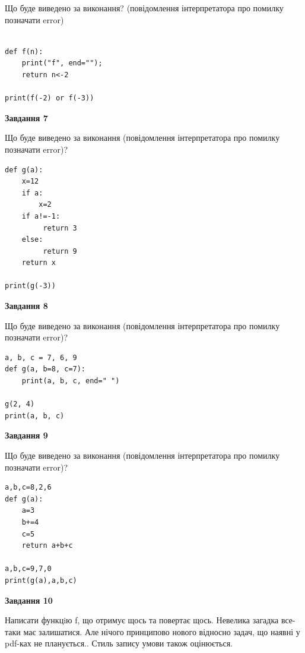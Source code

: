 \documentclass[12pt, ukrainian]{article}
\begin{document}
{\begin {large}
Що буде виведено за виконання? (повідомлення інтерпретатора про помилку позначати error)\par
\begin{verbatim}

def f(n):
    print("f", end="");
    return n<-2

print(f(-2) or f(-3))
\end{verbatim}

{\begin {center}\textbf{Завдання 7}\end {center}}

Що буде виведено за виконання (повідомлення інтерпретатора про помилку позначати error)?\par
\begin{verbatim}
def g(a):
    x=12
    if a: 
        x=2
    if a!=-1:
         return 3
    else:
         return 9
    return x

print(g(-3))
\end{verbatim}

{\begin {center}\textbf{Завдання 8}\end {center}}

Що буде виведено за виконання (повідомлення інтерпретатора про помилку позначати error)?\par
\begin{verbatim}
a, b, c = 7, 6, 9
def g(a, b=8, c=7):
    print(a, b, c, end=" ")

g(2, 4)
print(a, b, c)
\end{verbatim}

{\begin {center}\textbf{Завдання 9}\end {center}}

Що буде виведено за виконання (повідомлення інтерпретатора про помилку позначати error)?\par
\begin{verbatim}
a,b,c=8,2,6
def g(a):
    a=3
    b+=4
    c=5
    return a+b+c

a,b,c=9,7,0
print(g(a),a,b,c)
\end{verbatim}

{\begin {center}\textbf{Завдання 10}\end {center}}


Написати функцiю f, що отримує щось та повертає щось. Невелика загадка все-таки має залишатися. Але нічого принципово нового відносно задач, що наявні у pdf-ках не планується.. Стиль запису умови також оцінюється.\par
\end {large}}
\newpage
\end{document}
